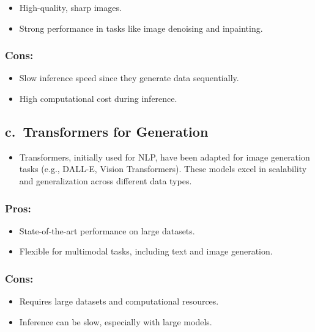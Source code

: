 \documentclass[
]{book}
\providecommand{\tightlist}{%
  \setlength{\itemsep}{0pt}\setlength{\parskip}{0pt}}
\begin{document}
\begin{itemize}
\tightlist
\item
  High-quality, sharp images.
\item
  Strong performance in tasks like image denoising and inpainting.
\end{itemize}

\subsubsection{Cons:}\label{cons-8}

\begin{itemize}
\tightlist
\item
  Slow inference speed since they generate data sequentially.
\item
  High computational cost during inference.
\end{itemize}

\subsection{c.~Transformers for Generation}\label{c.-transformers-for-generation}

\begin{itemize}
\tightlist
\item
  Transformers, initially used for NLP, have been adapted for image generation tasks (e.g., DALL-E, Vision Transformers). These models excel in scalability and generalization across different data types.
\end{itemize}

\subsubsection{Pros:}\label{pros-9}

\begin{itemize}
\tightlist
\item
  State-of-the-art performance on large datasets.
\item
  Flexible for multimodal tasks, including text and image generation.
\end{itemize}

\subsubsection{Cons:}\label{cons-9}

\begin{itemize}
\tightlist
\item
  Requires large datasets and computational resources.
\item
  Inference can be slow, especially with large models.
\end{itemize}
\end{document}
